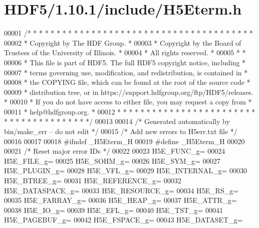 \hypertarget{_h_d_f5_21_810_81_2include_2_h5_eterm_8h_source}{}\section{H\+D\+F5/1.10.1/include/\+H5\+Eterm.h}
\label{_h_d_f5_21_810_81_2include_2_h5_eterm_8h_source}

\begin{DoxyCode}
00001 \textcolor{comment}{/* * * * * * * * * * * * * * * * * * * * * * * * * * * * * * * * * * * * * * *}
00002 \textcolor{comment}{ * Copyright by The HDF Group.                                               *}
00003 \textcolor{comment}{ * Copyright by the Board of Trustees of the University of Illinois.         *}
00004 \textcolor{comment}{ * All rights reserved.                                                      *}
00005 \textcolor{comment}{ *                                                                           *}
00006 \textcolor{comment}{ * This file is part of HDF5.  The full HDF5 copyright notice, including     *}
00007 \textcolor{comment}{ * terms governing use, modification, and redistribution, is contained in    *}
00008 \textcolor{comment}{ * the COPYING file, which can be found at the root of the source code       *}
00009 \textcolor{comment}{ * distribution tree, or in https://support.hdfgroup.org/ftp/HDF5/releases.  *}
00010 \textcolor{comment}{ * If you do not have access to either file, you may request a copy from     *}
00011 \textcolor{comment}{ * help@hdfgroup.org.                                                        *}
00012 \textcolor{comment}{ * * * * * * * * * * * * * * * * * * * * * * * * * * * * * * * * * * * * * * */}
00013 
00014 \textcolor{comment}{/* Generated automatically by bin/make\_err -- do not edit */}
00015 \textcolor{comment}{/* Add new errors to H5err.txt file */}
00016 
00017 
00018 \textcolor{preprocessor}{#ifndef \_H5Eterm\_H}
00019 \textcolor{preprocessor}{#define \_H5Eterm\_H}
00020 
00021 \textcolor{comment}{/* Reset major error IDs */}
00022     
00023 H5E\_FUNC\_g=    
00024 H5E\_FILE\_g=    
00025 H5E\_SOHM\_g=    
00026 H5E\_SYM\_g=    
00027 H5E\_PLUGIN\_g=    
00028 H5E\_VFL\_g=    
00029 H5E\_INTERNAL\_g=    
00030 H5E\_BTREE\_g=    
00031 H5E\_REFERENCE\_g=    
00032 H5E\_DATASPACE\_g=    
00033 H5E\_RESOURCE\_g=    
00034 H5E\_RS\_g=    
00035 H5E\_FARRAY\_g=    
00036 H5E\_HEAP\_g=    
00037 H5E\_ATTR\_g=    
00038 H5E\_IO\_g=    
00039 H5E\_EFL\_g=    
00040 H5E\_TST\_g=    
00041 H5E\_PAGEBUF\_g=    
00042 H5E\_FSPACE\_g=    
00043 H5E\_DATASET\_g=    

\end{DoxyCode}
